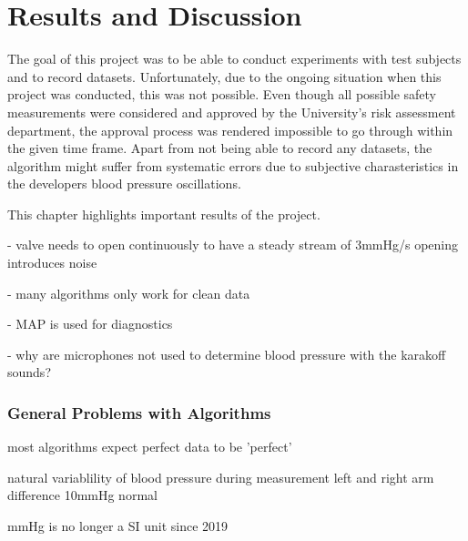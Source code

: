 \chapter{Results and Discussion}\label{cp:res}

The goal of this project was to be able to conduct experiments with test subjects and to record datasets. Unfortunately, due to the ongoing situation when this project was conducted, this was not possible. Even though all possible safety measurements were considered and approved by the University's risk assessment department, the approval process was rendered impossible to go through within the given time frame. Apart from not being able to record any datasets, the algorithm might suffer from systematic errors due to subjective charasteristics in the developers blood pressure oscillations. 


This chapter highlights important results of the project.


- valve needs to open continuously to have a steady stream of 3mmHg/s
  opening introduces noise

- many algorithms only work for clean data

- MAP is used for diagnostics 

- why are microphones not used to determine blood pressure with the karakoff sounds?


\subsection{General Problems with Algorithms}
most algorithms expect perfect data to be 'perfect'

natural variablility of blood pressure during measurement
left and right arm difference 10mmHg normal


mmHg is no longer a SI unit since 2019